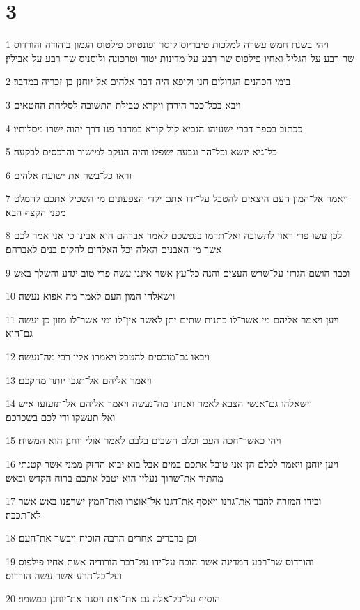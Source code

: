 \chapter{3}

\par 1 ויהי בשנת חמש עשרה למלכות טיבריוס קיסר ופונטיוס פילטוס הגמון ביהודה והורדוס שר־רבע על־הגליל ואחיו פילפוס שר־רבע על־מדינות יטור וטרכונה ולוסניס שר־רבע על־אבילין׃
\par 2 בימי הכהנים הגדולים חנן וקיפא היה דבר אלהים אל־יוחנן בן־זכריה במדבר׃
\par 3 ויבא בכל־ככר הירדן ויקרא טבילת התשובה לסליחת החטאים׃
\par 4 ככתוב בספר דברי ישעיהו הנביא קול קורא במדבר פנו דרך יהוה ישרו מסלותיו׃
\par 5 כל־גיא ינשא וכל־הר וגבעה ישפלו והיה העקב למישור והרכסים לבקעה׃
\par 6 וראו כל־בשר את ישועת אלהים׃
\par 7 ויאמר אל־המון העם היצאים להטבל על־ידו אתם ילדי הצפעונים מי השכיל אתכם להמלט מפני הקצף הבא׃
\par 8 לכן עשו פרי ראוי לתשובה ואל־תדמו בנפשכם לאמר אברהם הוא אבינו כי אני אמר לכם אשר מן־האבנים האלה יכל האלהים להקים בנים לאברהם׃
\par 9 וכבר הושם הגרזן על־שרש העצים והנה כל־עץ אשר איננו עשה פרי טוב יגדע והשלך באש׃
\par 10 וישאלהו המון העם לאמר מה אפוא נעשה׃
\par 11 ויען ויאמר אליהם מי אשר־לו כתנות שתים יתן לאשר אין־לו ומי אשר־לו מזון כן יעשה גם־הוא׃
\par 12 ויבאו גם־מוכסים להטבל ויאמרו אליו רבי מה־נעשה׃
\par 13 ויאמר אליהם אל־תגבו יותר מחקכם׃
\par 14 וישאלהו גם־אנשי הצבא לאמר ואנחנו מה־נעשה ויאמר אליהם אל־תזעזעו איש ואל־תעשקו ודי לכם בשכרכם׃
\par 15 ויהי כאשר־חכה העם וכלם חשבים בלבם לאמר אולי יוחנן הוא המשיח׃
\par 16 ויען יוחנן ויאמר לכלם הן־אני טובל אתכם במים אבל בוא יבוא החזק ממני אשר קטנתי מהתיר את־שרוך נעליו הוא יטבל אתכם ברוח הקדש ובאש׃
\par 17 ובידו המזרה להבר את־גרנו ויאסף את־דגנו אל־אוצרו ואת־המץ ישרפנו באש אשר לא־תכבה׃
\par 18 וכן בדברים אחרים הרבה הוכיח ויבשר את־העם׃
\par 19 והורדוס שר־רבע המדינה אשר הוכח על־ידו על־דבר הורודיה אשת אחיו פילפוס ועל־כל־הרע אשר עשה הורדוס׃
\par 20 הוסיף על־כל־אלה גם את־זאת ויסגר את־יוחנן במשמר׃
